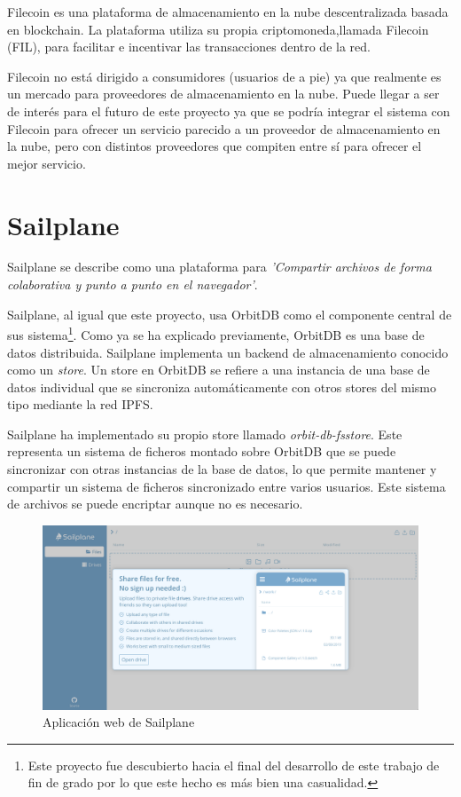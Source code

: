 Filecoin\cite{filecoinDecentralizedStorageNetwork} es una plataforma de almacenamiento en la nube descentralizada basada en
blockchain. La plataforma utiliza su propia criptomoneda,llamada Filecoin (FIL), para facilitar e incentivar las transacciones dentro
de la red.

Filecoin no está dirigido a consumidores (usuarios de a pie) ya que realmente es un mercado para proveedores de almacenamiento en la nube. Puede llegar
a ser de interés para el futuro de este proyecto ya que se podría integrar el sistema con Filecoin para ofrecer un servicio parecido
a un proveedor de almacenamiento en la nube, pero con distintos proveedores que compiten entre sí para ofrecer el mejor servicio.

\section{Sailplane}

Sailplane se describe como una plataforma para \textit{'Compartir archivos de forma colaborativa y punto a punto en el navegador'}.

Sailplane, al igual que este proyecto, usa OrbitDB como el componente central de sus sistema\footnote{Este proyecto fue descubierto
    hacia el final del desarrollo de este trabajo de fin de grado por lo que este hecho es más bien una casualidad.}.
Como ya se ha explicado previamente, OrbitDB es una base de datos distribuida. Sailplane implementa un backend de almacenamiento
conocido como un \textit{store}. Un store en OrbitDB se refiere a una instancia de una base de datos individual que se sincroniza
automáticamente con otros stores del mismo tipo mediante la red IPFS.

Sailplane ha implementado su propio store llamado \textit{orbit-db-fsstore}\cite{TabcatOrbitdbfsstoreCustom}. Este representa
un sistema de ficheros montado sobre OrbitDB que se puede sincronizar con otras instancias de la base de datos, lo que permite
mantener y compartir un sistema de ficheros sincronizado entre varios usuarios. Este sistema de archivos se puede encriptar aunque no es necesario.

\begin{figure}[H]
    \centering
    \small
    \includegraphics[width=\linewidth]{images/sailplane.png}
    \caption{Aplicación web de Sailplane}
    \label{fig:sailplaneweb}
\end{figure}

